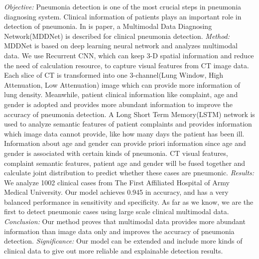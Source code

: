 \emph{Objective:} Pneumonia detection is one of the most crucial steps in pneumonia diagnosing system. Clinical information of patients plays an important role in detection of pneumonia. In is paper, a Multimodal Data Diagnosing Network(MDDNet) is described for clinical pneumonia detection.
\emph{Method:} MDDNet is based on deep learning neural network and analyzes multimodal data. We use Recurrent CNN, which can keep 3-D spatial information and reduce the need of calculation resource, to capture visual features from CT image data. Each slice of CT is transformed into one 3-channel(Lung Window, High Attenuation, Low Attenuation) image which can provide more information of lung density. Meanwhile, patient clinical information like complaint, age and gender is adopted and provides more abundant information to improve the accuracy of pneumonia detection. A Long Short Term Memory(LSTM) network is used to analyze semantic features of patient complaints and provides information which image data cannot provide, like how many days the patient has been ill. Information about age and gender can provide priori information since age and gender is associated with certain kinds of pneumonia. CT visual features, complaint semantic features, patient age and gender will be fused together and calculate joint distribution to predict whether these cases are pneumonic.
\emph{Results:} We analyze 1002 clinical cases from The First Affiliated Hospital of Army Medical University. Our model achieves 0.945 in accuracy, and has a very balanced performance in sensitivity and specificity. As far as we know, we are the first to detect pneumonic cases using large scale clinical multimodal data.
\emph{Conclusion:} Our method proves that multimodal data provides more abundant information than image data only and improves the accuracy of pneumonia detection. 
\emph{Significance:} Our model can be extended and include more kinds of clinical data to give out more reliable and explainable detection results.